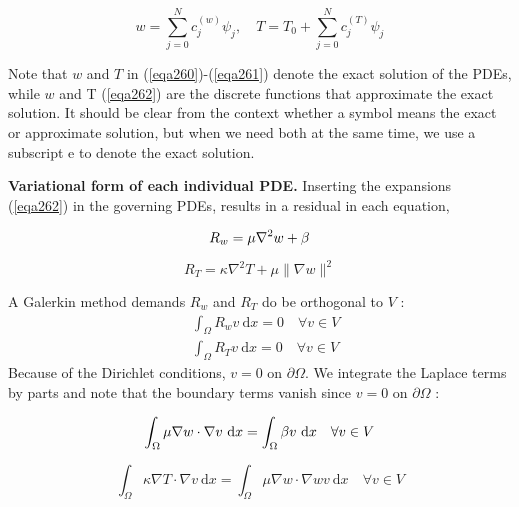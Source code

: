 \documentclass[../main.tex]{subfiles}
\begin{document}
		\begin{equation}
			\label{eqa262}
		w=\sum_{j=0}^{N} c_{j}^{(w)} \psi_{j}, \quad T=T_{0}+\sum_{j=0}^{N} c_{j}^{(T)} \psi_{j}
		\end{equation}
	
		\noindent Note that $w$ and $T$ in (\ref{eqa260})-(\ref{eqa261}) denote the exact solution of the PDEs, while $w$ and T (\ref{eqa262}) are the discrete functions that approximate the exact solution. It should be clear from the context whether a symbol means the exact or approximate solution, but when we need both at the same time, we use a subscript e to denote the exact solution.\bigbreak
		
		\noindent \textbf{Variational form of each individual PDE.   } Inserting the expansions (\ref{eqa262}) in the governing PDEs, results in a residual in each equation,
		
		\begin{equation}
			\label{eqa263}
			R_{w}=\mu \nabla^{2} w+\beta \\
		\end{equation}
	
		\begin{equation}
			\label{eqa264}
			R_{T}=\kappa \nabla^{2} T+\mu\|\nabla w\|^{2}
		\end{equation}
		
		\noindent A Galerkin method demands $R_{w}$ and $R_{T}$ do be orthogonal to $V$ :
		$$
		\begin{aligned}
			&\int_{\Omega} R_{w} v \mathrm{~d} x=0 \quad \forall v \in V \\
			&\int_{\Omega} R_{T} v \mathrm{~d} x=0 \quad \forall v \in V
		\end{aligned}
		$$
		Because of the Dirichlet conditions, $v=0$ on $\partial \Omega$. We integrate the Laplace terms by parts and note that the boundary terms vanish since $v=0$ on $\partial \Omega$ :
		
		\begin{equation}
			\label{eqa265}
			\int_{\Omega} \mu \nabla w \cdot \nabla v \mathrm{~d} x=\int_{\Omega} \beta v \mathrm{~d} x \quad \forall v \in V \\
		\end{equation}
	
		\begin{equation}
			\label{eqa266}
			\int_{\Omega} \kappa \nabla T \cdot \nabla v \mathrm{~d} x=\int_{\Omega} \mu \nabla w \cdot \nabla w v \mathrm{~d} x \quad \forall v \in V
		\end{equation}
		
\end{document}
